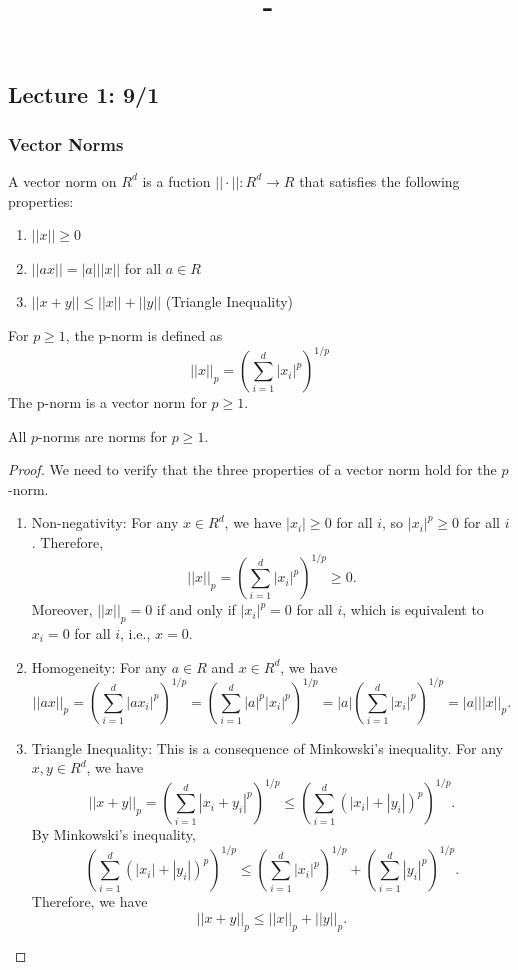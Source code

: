 \documentclass[answers,12pt,addpoints]{exam}
\author{\name}
\title{\course \ - \assignment}
\begin{document}
\maketitle
\tableofcontents
\newpage
\subsection{Lecture 1: 9/1}
\subsubsection{Vector Norms}
\begin{definition}
     A vector norm on $R^d$ is a fuction $||\cdot||: R^d \to R$ that satisfies the following properties:
    \begin{enumerate}
        \item $||x|| \geq 0$
        \item $||ax|| = |a| ||x||$ for all $a \in R$
        \item $||x+y|| \leq ||x|| + ||y||$ (Triangle Inequality)
    \end{enumerate}
\end{definition}
\begin{example}
    [p-norm] For $p \geq 1$, the p-norm is defined as
    $$||x||_p = \left( \sum_{i=1}^{d} |x_i|^p \right)^{1/p}$$
    The p-norm is a vector norm for $p \geq 1$.
\end{example}
\begin{theorem}
    All $p$-norms are norms for $p \geq 1$.
    \begin{proof}
        We need to verify that the three properties of a vector norm hold for the $p$-norm.

        \begin{enumerate}
            \item Non-negativity: For any $x \in R^d$, we have $|x_i| \geq 0$ for all $i$, so $|x_i|^p \geq 0$ for all $i$. Therefore,
            $$||x||_p = \left( \sum_{i=1}^{d} |x_i|^p \right)^{1/p} \geq 0.$$
            Moreover, $||x||_p = 0$ if and only if $|x_i|^p = 0$ for all $i$, which is equivalent to $x_i = 0$ for all $i$, i.e., $x = 0$.

            \item Homogeneity: For any $a \in R$ and $x \in R^d$, we have
            $$||ax||_p = \left( \sum_{i=1}^{d} |ax_i|^p \right)^{1/p} = \left( \sum_{i=1}^{d} |a|^p |x_i|^p \right)^{1/p} = |a| \left( \sum_{i=1}^{d} |x_i|^p \right)^{1/p} = |a| ||x||_p.$$

            \item Triangle Inequality: This is a consequence of Minkowski's inequality. For any $x, y \in R^d$, we have
            $$||x+y||_p = \left( \sum_{i=1}^{d} |x_i+y_i|^p \right)^{1/p} \leq \left( \sum_{i=1}^{d} (|x_i|+|y_i|)^p \right)^{1/p}.$$
            By Minkowski's inequality,
            $$\left( \sum_{i=1}^{d} (|x_i|+|y_i|)^p \right)^{1/p} \leq \left( \sum_{i=1}^{d} |x_i|^p \right)^{1/p} + \left( \sum_{i=1}^{d} |y_i|^p \right)^{1/p}.$$
            Therefore, we have
            $$||x+y||_p \leq ||x||_p + ||y||_p.$$
        \end{enumerate}
    \end{proof}
\end{theorem}
\end{document}
